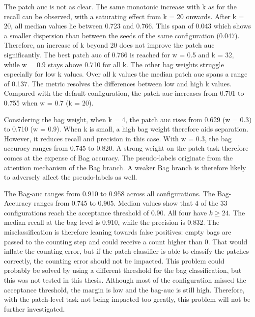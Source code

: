 \documentclass[12pt,parskip = half, DIV=classic,listof=totoc]{scrartcl}
\begin{document}
			The patch \ac{auc} is not as clear. The same monotonic increase with k as for the recall can be observed, with a saturating effect from k = 20 
			onwards. After k = 20, all median values lie between 0.723 and 0.766. This span of 0.043 which shows a smaller dispersion than between 
			the seeds of the same configuration (0.047). Therefore, an increase of k beyond 20 does not improve the patch \ac{auc} significantly. 
			The best patch \ac{auc} of 0.766 is reached for w = 0.5 and k = 32, while w = 0.9 stays above 0.710 for all k. The other 
			bag weights struggle especially for low k values. Over all k values the median patch \ac{auc} spans a range of 0.137.
			The metric resolves the differences between low and high k values. Compared with the default configuration, the patch \ac{auc} increases from 
			0.701 to 0.755 when w = 0.7 (k = 20).

			Considering the bag weight, when k = 4, the patch \ac{auc} rises from 0.629 (w = 0.3) to 0.710
			(w = 0.9). When k is small, a high bag weight therefore aids separation. However, it reduces
			recall and precision in this case. With w = 0.3, the bag accuracy ranges from 0.745 to
			0.820. A strong weight on the patch task therefore comes at the expense of
			Bag accuracy. The pseudo-labels originate from the attention mechanism of the Bag branch. A
			weaker Bag branch is therefore likely to adversely affect the pseudo-labels as well.
			
			The Bag-\acs*{auc} ranges from 0.910 to 0.958 across all configurations.
			The Bag-Accuracy ranges from 0.745 to 0.905. Median values show that 4 of the 33
			configurations reach the acceptance threshold of 0.90. All four have $k \geq 24$.
			The median recall at the bag level is 0.910, while the precision is 0.832. The misclassification 
			is therefore leaning towards false positives: empty bags are passed to the counting step and could receive a count higher than 0.
			That would inflate the counting error, but if the patch classifier is able to classify the patches correctly, the counting error should not be impacted.
			This problem could probably be solved by using a different threshold for the bag classification, but this was not tested in this thesis.
			Although most of the configuration missed the acceptance threshold, the margin is low and the bag-\acs*{auc} is still high. 
			Therefore, with the patch-level task not being impacted too greatly, this problem will not be further investigated.
\end{document}

